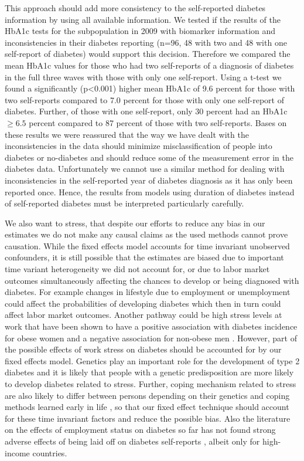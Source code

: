 \documentclass[12pt,english,british]{article}
\begin{document}
This approach should add more consistency to the self-reported diabetes
information by using all available information. We tested if the results
of the \ac{HbA1c} tests for the subpopulation in 2009 with biomarker
information and inconsistencies in their diabetes reporting (n=96,
48 with two and 48 with one self-report of diabetes) would support
this decision. Therefore we compared the mean \ac{HbA1c} values for those
who had two self-reports of a diagnosis of diabetes in the full three
waves with those with only one self-report. Using a t-test we found
a significantly (p<0.001) higher mean \ac{HbA1c} of 9.6 percent
for those with two self-reports compared to 7.0 percent for those
with only one self-report of diabetes. Further, of those with one
self-report, only 30 percent had an \ac{HbA1c}$\geq6.5$ percent
compared to 87 percent of those with two self-reports. Bases on these results we were reassured that the way we have dealt with the inconsistencies in the data should
minimize misclassification of people into diabetes or no-diabetes
and should reduce some of the measurement error in the diabetes data. Unfortunately we cannot use a similar method for dealing with inconsistencies
in the self-reported year of diabetes diagnosis as it has only been reported once. Hence, the results from models using
duration of diabetes instead of self-reported diabetes must be interpreted
particularly carefully.

We also want to stress, that despite our efforts to reduce any bias in our estimates we do not make any causal claims as the used methods cannot prove causation. While the fixed effects model accounts for time invariant
unobserved confounders, it is still possible that the estimates are biased
due to important time variant heterogeneity we did not account for, or
due to labor market outcomes simultaneously affecting the chances to develop or
being diagnosed with diabetes. For example changes in lifestyle due to
employment or unemployment could affect the probabilities of developing
diabetes which then in turn could affect labor market outcomes. Another pathway could be high stress levels at
work that have been shown to have a positive association with
diabetes incidence for obese women and a negative association for
non-obese men \citep{Heraclides2012,Eriksson2013}. However, part
of the possible effects of work stress on diabetes should be accounted
for by our fixed effects model. Genetics play an important role for
the development of type 2 diabetes and it is likely that people with
a genetic predisposition are more likely to develop diabetes related
to stress. Further, coping mechanism related to stress are also likely
to differ between persons depending on their genetics and coping
methods learned early in life \citep{Schneiderman2005}, so that our
fixed effect technique should account for these time invariant factors
and reduce the possible bias. Also the literature on the effects of employment
status on diabetes so far has not found strong adverse effects of being laid
off on diabetes self-reports \citep{Bergemann2011,Schaller2015},
albeit only for high-income countries.
\end{document}
